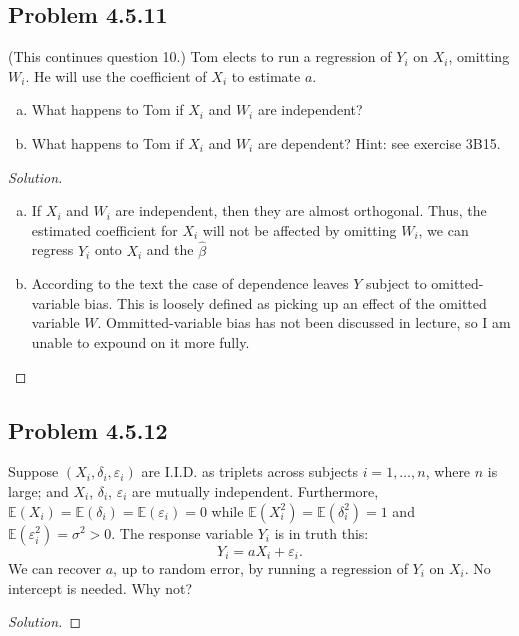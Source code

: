 \documentclass{amsart}\usepackage[]{graphicx}\usepackage[]{color}
\newcommand{\ep}{\varepsilon}
\begin{document}
		\subsection*{Problem 4.5.11} %
		\label{ssub:problem_4_5_11}
			(This continues question 10.)
			Tom elects to run a regression of $Y_{i}$ on $X_{i}$, omitting $W_{i}$. He will use the coefficient of $X_{i}$ to estimate $a$.
			\begin{enumerate}[(a)]
				\item What happens to Tom if $X_{i}$ and $W_{i}$ are independent?
				\item What happens to Tom if $X_{i}$ and $W_{i}$ are dependent?
				Hint: see exercise 3B15.
			\end{enumerate}
			\begin{proof}[Solution] \
				\begin{enumerate}[(a)]
					\item If $X_{i}$ and $W_{i}$ are independent, then they are almost orthogonal. Thus, the estimated coefficient for $X_{i}$ will not be affected by omitting $W_{i}$, we can regress $Y_{i}$ onto $X_{i}$ and the $\hat{\beta}$
					\item According to the text the case of dependence leaves $Y$ subject to omitted-variable bias.
					This is loosely defined as picking up an effect of the omitted variable $W$.
					Ommitted-variable bias has not been discussed in lecture, so I am unable to expound on it more fully.
				\end{enumerate}
			\end{proof}
		\subsection*{Problem 4.5.12} %
		\label{ssub:problem_4_5_12}
			Suppose $(X_{i},\delta_{i},\ep_{i})$ are I.I.D. as triplets across subjects $i = 1,\dots,n$, where $n$ is large; and $X_{i}$, $\delta_{i}$, $\ep_{i}$ are mutually independent.
			Furthermore, $\mathbb{E}(X_{i}) = \mathbb{E}(\delta_{i}) = \mathbb{E}(\ep_{i}) = 0$ while $\mathbb{E}(X_{i}^{2}) = \mathbb{E}(\delta_{i}^{2}) = 1$ and $\mathbb{E}(\ep_{i}^{2}) = \sigma^{2} > 0$.
			The response variable $Y_{i}$ is in truth this: $$Y_{i} = aX_{i} + \ep_{i}.$$
			We can recover $a$, up to random error, by running a regression of $Y_{i}$ on $X_{i}$.
			No intercept is needed.
			Why not?
			\begin{proof}[Solution]
			\end{proof}
\end{document}
